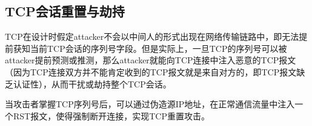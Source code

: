 \subsection{TCP会话重置与劫持}
TCP在设计时假定attacker不会以中间人的形式出现在网络传输链路中，即无法提前获知当前TCP会话的序列号字段。但是实际上，一旦TCP的序列号可以被attacker提前预测或推测，那么attacker就能向TCP连接中注入恶意的TCP报文（因为TCP连接双方并不能肯定收到的TCP报文就是来自对方的，即TCP报文缺乏认证性），从而干扰或劫持整个TCP会话。

当攻击者掌握TCP序列号后，可以通过伪造源IP地址，在正常通信流量中注入一个RST报文，使得强制断开连接，实现TCP重置攻击。